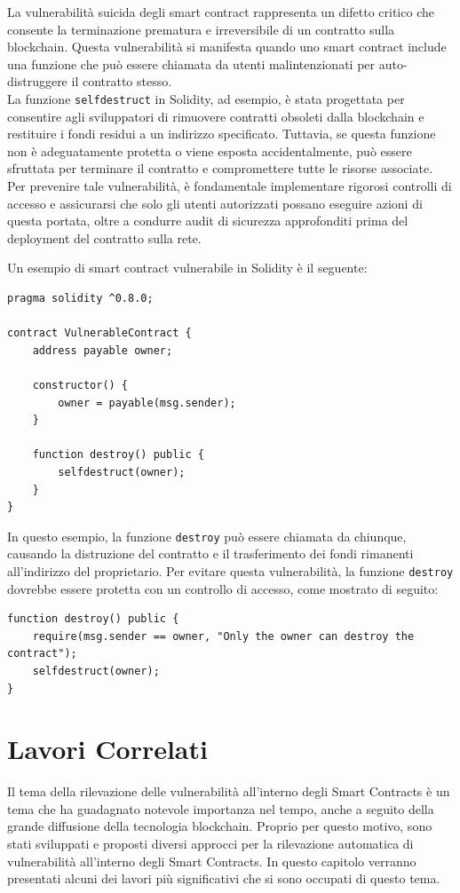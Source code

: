 \documentclass[../../Thesis.tex]{subfiles}
\begin{document}
La vulnerabilità suicida degli smart contract rappresenta un difetto critico che consente la terminazione prematura e irreversibile di un contratto sulla blockchain. Questa vulnerabilità si manifesta quando uno smart contract include una funzione che può essere chiamata da utenti malintenzionati per auto-distruggere il contratto stesso.\\
La funzione \texttt{selfdestruct} in Solidity, ad esempio, è stata progettata per consentire agli sviluppatori di rimuovere contratti obsoleti dalla blockchain e restituire i fondi residui a un indirizzo specificato. Tuttavia, se questa funzione non è adeguatamente protetta o viene esposta accidentalmente, può essere sfruttata per terminare il contratto e compromettere tutte le risorse associate. Per prevenire tale vulnerabilità, è fondamentale implementare rigorosi controlli di accesso e assicurarsi che solo gli utenti autorizzati possano eseguire azioni di questa portata, oltre a condurre audit di sicurezza approfonditi prima del deployment del contratto sulla rete.

Un esempio di smart contract vulnerabile in Solidity è il seguente:

\begin{lstlisting}[language=Solidity]
pragma solidity ^0.8.0;

contract VulnerableContract {
    address payable owner;

    constructor() {
        owner = payable(msg.sender);
    }

    function destroy() public {
        selfdestruct(owner);
    }
}
\end{lstlisting}

In questo esempio, la funzione \texttt{destroy} può essere chiamata da chiunque, causando la distruzione del contratto e il trasferimento dei fondi rimanenti all'indirizzo del proprietario. Per evitare questa vulnerabilità, la funzione \texttt{destroy} dovrebbe essere protetta con un controllo di accesso, come mostrato di seguito:

\begin{lstlisting}[language=Solidity]
function destroy() public {
    require(msg.sender == owner, "Only the owner can destroy the contract");
    selfdestruct(owner);
}
\end{lstlisting}



\section{Lavori Correlati}
\label{ch:relatedwork}
Il tema della rilevazione delle vulnerabilità all'interno degli Smart Contracts è un tema che ha guadagnato notevole importanza nel tempo, anche a seguito della grande diffusione della tecnologia blockchain. Proprio per questo motivo, sono stati sviluppati e proposti diversi approcci per la rilevazione automatica di vulnerabilità all'interno degli Smart Contracts. In questo capitolo verranno presentati alcuni dei lavori più significativi che si sono occupati di questo tema.
\end{document}
